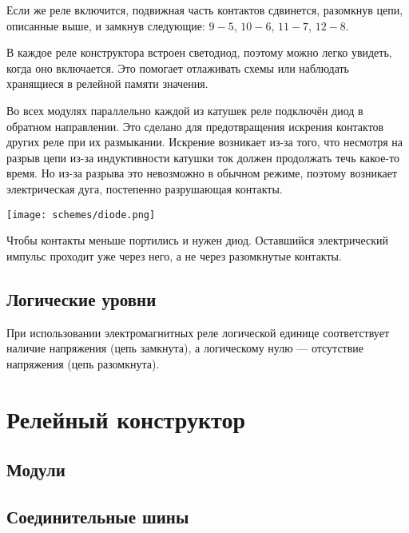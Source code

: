 Если же реле включится, подвижная часть контактов сдвинется, разомкнув цепи,
описанные выше, и замкнув следующие: $9-5$, $10-6$, $11-7$, $12-8$.

В каждое реле конструктора встроен светодиод, поэтому можно легко увидеть,
когда оно включается. Это помогает отлаживать схемы или наблюдать
хранящиеся в релейной памяти значения.

Во всех модулях параллельно каждой из катушек реле подключён диод в обратном
направлении. Это сделано для предотвращения искрения контактов других реле
при их размыкании.
Искрение возникает из-за того, что несмотря на разрыв цепи из-за индуктивности катушки
ток должен продолжать течь какое-то время. Но из-за разрыва это невозможно
в обычном режиме, поэтому возникает электрическая дуга, постепенно разрушающая контакты.

\begin{center}
\texttt{[image: schemes/diode.png]}
\end{center}

Чтобы контакты меньше портились и нужен диод. Оставшийся электрический импульс проходит
уже через него, а не через разомкнутые контакты.

\section{Логические уровни}

При использовании электромагнитных реле логической единице соответствует
наличие напряжения (цепь замкнута), а логическому нулю --- отсутствие напряжения
(цепь разомкнута).


\chapter{Релейный конструктор}

\section{Модули}

\section{Соединительные шины}


